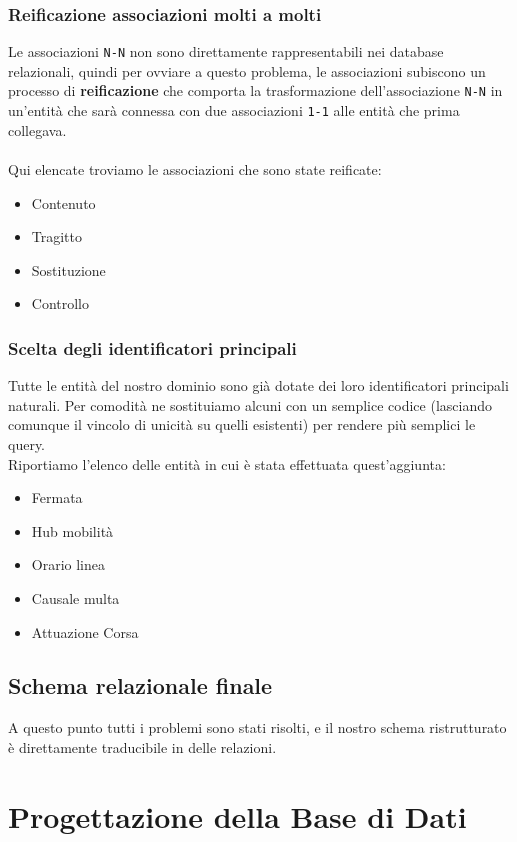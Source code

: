 \documentclass[12pt,a4paper]{report}
\begin{document}
\subsection{Reificazione associazioni molti a molti}
Le associazioni \texttt{N-N} non sono direttamente rappresentabili nei database relazionali, quindi per ovviare a questo problema, le associazioni subiscono un processo di \textbf{reificazione} che comporta la trasformazione dell'associazione \texttt{N-N} in un'entità che sarà connessa con due associazioni \texttt{1-1} alle entità che prima collegava.\\ \\
Qui elencate troviamo le associazioni che sono state reificate:
\begin{itemize}
    \item Contenuto
    \item Tragitto
    \item Sostituzione
    \item Controllo
\end{itemize}

\subsection{Scelta degli identificatori principali}
Tutte le entità del nostro dominio sono già dotate dei loro identificatori principali naturali.
Per comodità ne sostituiamo alcuni con un semplice codice (lasciando comunque il vincolo di unicità su quelli esistenti) per rendere più semplici le query.\\
Riportiamo l'elenco delle entità in cui è stata effettuata quest'aggiunta:
\begin{itemize}
    \item Fermata
    \item Hub mobilità
    \item Orario linea
    \item Causale multa
    \item Attuazione Corsa
\end{itemize}

\section{Schema relazionale finale}\label{section:schema_relazionale}
A questo punto tutti i problemi sono stati risolti, e il nostro schema ristrutturato è direttamente traducibile in delle relazioni.

\chapter{Progettazione della Base di Dati}
\end{document}
